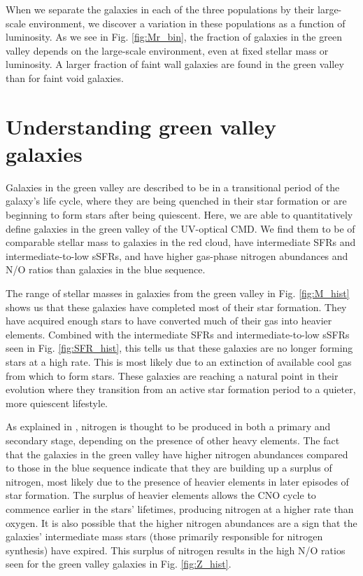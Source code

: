 When we separate the galaxies in each of the three populations by their 
large-scale environment, we discover a variation in these populations as a 
function of luminosity.  As we see in Fig. \ref{fig:Mr_bin}, the fraction of 
galaxies in the green valley depends on the large-scale environment, even at 
fixed stellar mass or luminosity.  A larger fraction of faint wall galaxies are 
found in the green valley than for faint void galaxies.




\section[Discussion]{Understanding green valley galaxies}\label{sec:discussion_GV}

Galaxies in the green valley are described to be in a transitional period of the 
galaxy's life cycle, where they are being quenched in their star formation or 
are beginning to form stars after being quiescent.  Here, we are able to 
quantitatively define galaxies in the green valley of the UV-optical CMD.  We 
find them to be of comparable stellar mass to galaxies in the red cloud, have 
intermediate SFRs and intermediate-to-low sSFRs, and have higher gas-phase 
nitrogen abundances and N/O ratios than galaxies in the blue sequence.

The range of stellar masses in galaxies from the green valley in Fig. 
\ref{fig:M_hist} shows us that these galaxies have completed most of their star 
formation.  They have acquired enough stars to have converted much of their gas 
into heavier elements.  Combined with the intermediate SFRs and 
intermediate-to-low sSFRs seen in Fig. \ref{fig:SFR_hist}, this tells us that 
these galaxies are no longer forming stars at a high rate.  This is most likely 
due to an extinction of available cool gas from which to form stars.  These 
galaxies are reaching a natural point in their evolution where they transition 
from an active star formation period to a quieter, more quiescent lifestyle.

As explained in \cite{Douglass17b}, nitrogen is thought to be produced in both a 
primary and secondary stage, depending on the presence of other heavy elements.  
The fact that the galaxies in the green valley have higher nitrogen abundances 
compared to those in the blue sequence indicate that they are building up a 
surplus of nitrogen, most likely due to the presence of heavier elements in 
later episodes of star formation.  The surplus of heavier elements allows the 
CNO cycle to commence earlier in the stars' lifetimes, producing nitrogen at a 
higher rate than oxygen.  It is also possible that the higher nitrogen 
abundances are a sign that the galaxies' intermediate mass stars (those 
primarily responsible for nitrogen synthesis) have expired.  This surplus of 
nitrogen results in the high N/O ratios seen for the green valley galaxies in 
Fig. \ref{fig:Z_hist}.

